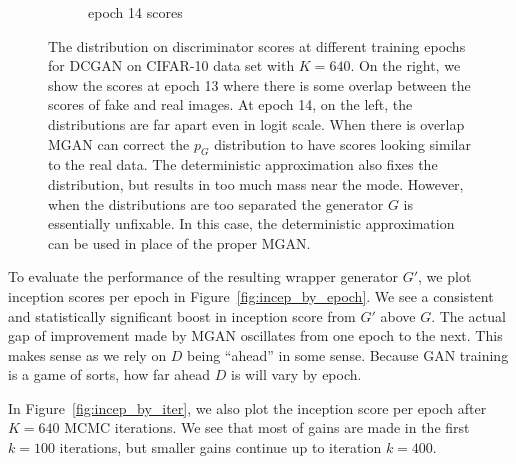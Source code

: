 \documentclass{article}
\newcommand{\PG}{{p_G}}
\begin{document}
\begin{figure}
\begin{subfigure}[b]{0.49\textwidth}
       \caption{epoch 14 scores}
       \label{fig:score_dist_no_overlap}
    \end{subfigure}
    \caption{{\small
    The distribution on discriminator scores at different training epochs for DCGAN on CIFAR-10 data set with $K=640$.
    On the right, we show the scores at epoch 13 where there is some overlap between the scores of fake and real images.
    At epoch 14, on the left, the distributions are far apart even in logit scale.
    When there is overlap MGAN can correct the $\PG$ distribution to have scores looking similar to the real data.
    The deterministic approximation also fixes the distribution, but results in too much mass near the mode.
    However, when the distributions are too separated the generator $G$ is essentially unfixable.
    In this case, the deterministic approximation can be used in place of the proper MGAN\@.
    }}
\end{figure}

To evaluate the performance of the resulting wrapper generator $G'$, we plot inception scores per epoch in Figure~\ref{fig:incep_by_epoch}.
We see a consistent and statistically significant boost in inception score from $G'$ above $G$.
The actual gap of improvement made by MGAN oscillates from one epoch to the next.
This makes sense as we rely on $D$ being ``ahead'' in some sense.
Because GAN training is a game of sorts, how far ahead $D$ is will vary by epoch.

In Figure~\ref{fig:incep_by_iter}, we also plot the inception score per epoch after $K=640$ MCMC iterations.
We see that most of gains are made in the first $k=100$ iterations, but smaller gains continue up to iteration $k=400$.
\end{document}
